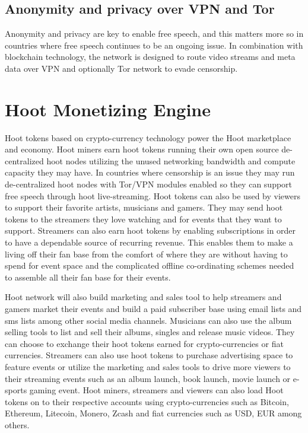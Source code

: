 \documentclass{article}
\begin{document}
\subsection{Anonymity and privacy over VPN and Tor}
Anonymity and privacy are key to enable free speech, and this matters
more so in countries where free speech continues to be an ongoing
issue. In combination with blockchain technology, the network is
designed to route video streams and meta data over VPN and optionally
Tor network to evade censorship.

\section{Hoot Monetizing Engine}
Hoot tokens based on crypto-currency technology power the Hoot
marketplace and economy. Hoot miners earn hoot tokens running their own open source
de-centralized hoot nodes utilizing the unused networking bandwidth
and compute capacity they may have. In countries where censorship is an issue they
may run de-centralized hoot nodes with Tor/VPN modules enabled so they can
support free speech through hoot
live-streaming. Hoot tokens can also be used by viewers to support their favorite artists,
musicians and gamers. They may send hoot tokens to the
streamers they love watching and for events that they want to
support. Streamers can also earn hoot tokens by enabling subscriptions in order to have a
dependable source of recurring revenue. This enables them to make a
living off their fan base from the comfort of where they are without
having to spend for event space and the complicated offline
co-ordinating schemes needed to assemble all their fan base for their events.

 Hoot network will also build marketing and sales tool to help
streamers and gamers market their 
events and build a paid subscriber base using email lists and sms lists among other social media
channels. 
Musicians can also use the album selling tools to list and sell
their albums, singles and release music videos. They can
choose to exchange their hoot tokens earned for crypto-currencies or fiat currencies.
 Streamers can also use hoot tokens to
purchase advertising space to feature events or utilize the marketing and sales
tools to drive more viewers to their
streaming events such as an album launch, book launch, movie launch or
e-sports gaming event. Hoot miners, streamers and viewers can also load Hoot
tokens on to their respective accounts using crypto-currencies such as Bitcoin,
Ethereum, Litecoin, Monero, Zcash and fiat currencies such as USD, EUR among others.
\end{document}
